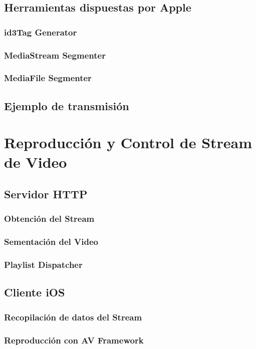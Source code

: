 	\subsection{Herramientas dispuestas por Apple}
		\subsubsection{id3Tag Generator}
		\subsubsection{MediaStream Segmenter}
		\subsubsection{MediaFile Segmenter}
	\subsection{Ejemplo de transmisión}
\clearpage	
\section{Reproducción y Control de Stream de Video}
	\subsection{Servidor HTTP}
		\subsubsection{Obtención del Stream}	
		\subsubsection{Sementación del Video}
		\subsubsection{Playlist Dispatcher}
	\subsection{Cliente iOS}
		\subsubsection{Recopilación de datos del Stream}
		\subsubsection{Reproducción con AV Framework}
